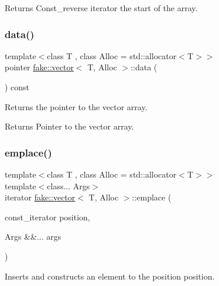 \begin{DoxyReturn}{Returns}
Const\+\_\+reverse iterator the start of the array. 
\end{DoxyReturn}
\mbox{\label{classfake_1_1vector_a308cb3c0d13198a2a968a5239bf416a0}} 
\subsubsection{\texorpdfstring{data()}{data()}}
{\footnotesize\ttfamily template$<$class T , class Alloc  = std\+::allocator$<$\+T$>$$>$ \\
pointer \mbox{\hyperlink{classfake_1_1vector}{fake\+::vector}}$<$ T, Alloc $>$\+::data (\begin{DoxyParamCaption}{ }\end{DoxyParamCaption}) const\hspace{0.3cm}{\ttfamily [inline]}}



Returns the pointer to the vector array. 

\begin{DoxyReturn}{Returns}
Pointer to the vector array. 
\end{DoxyReturn}
\mbox{\label{classfake_1_1vector_abc8d17690a8ec6dcbfcc3f02baad3f30}} 
\subsubsection{\texorpdfstring{emplace()}{emplace()}}
{\footnotesize\ttfamily template$<$class T , class Alloc  = std\+::allocator$<$\+T$>$$>$ \\
template$<$class... Args$>$ \\
iterator \mbox{\hyperlink{classfake_1_1vector}{fake\+::vector}}$<$ T, Alloc $>$\+::emplace (\begin{DoxyParamCaption}\item[{const\+\_\+iterator}]{position,  }\item[{Args \&\&...}]{args }\end{DoxyParamCaption})\hspace{0.3cm}{\ttfamily [inline]}}



Inserts and constructs an element to the position position. 


